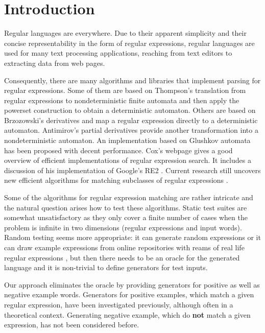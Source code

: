 \section{Introduction}

Regular languages are everywhere. Due to their apparent simplicity and
their concise representability in the form of regular expressions,
regular languages are used for many text processing
applications, reaching from text editors
\cite{DBLP:journals/cacm/Thompson68} to extracting data from web
pages.

Consequently, there are many algorithms and libraries that implement
parsing for regular expressions. Some of them are based on Thompson's
translation from regular expressions to nondeterministic finite
automata and then apply the powerset construction to obtain a
deterministic automaton. Others are based on Brzozowski's derivatives
\cite{Brzozowski1964} and
map a regular expression directly to a deterministic
automaton. Antimirov's partial derivatives \cite{Antimirov96Partial}
provide another transformation into a nondeterministic automaton. An
implementation based on Glushkov automata has been proposed
\cite{DBLP:conf/icfp/FischerHW10} with decent performance.
Cox's webpage \cite{cox07:_implem_regul_expres} gives a good overview
of efficient implementations of regular expression search. It includes
a discussion of his implementation of Google's RE2 \cite{cox10:_regul_expres_match_wild}.
Current research still uncovers new efficient algorithms for matching
subclasses of regular expressions \cite{DBLP:journals/jcss/GrozM17}.

Some of the algorithms for regular expression matching are rather
intricate and the natural question arises how to test these
algorithms. Static test suites are somewhat unsatisfactory as they
only cover a finite number of cases when the problem is infinite in
two dimensions (regular expressions and input words). Random testing
seems more appropriate: it can generate random expressions or it can
draw example expressions from online repositories with reams of real
life regular expressions \cite{regul_expres_librar}, but then there
needs to be an oracle for the generated language and it is non-trivial
to define generators for test inputs.

Our approach eliminates the oracle by providing generators
for positive as well as negative example words. Generators for
positive examples, which match a given regular expression, have been
investigated previously\cite{DBLP:journals/jcss/GrozM17,
  DBLP:journals/tcs/AckermanS09, DBLP:journals/jfp/McIlroy04,
  DBLP:journals/actaC/Makinen97}, although often in a theoretical
context. Generating negative example, which do \textbf{not} match a
given expression, has not been considered before.

